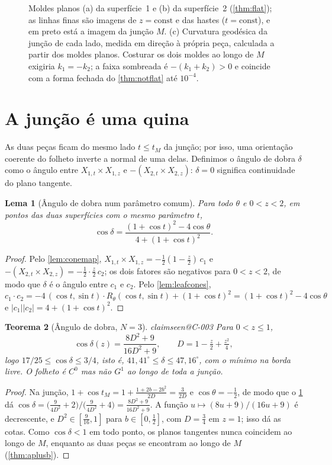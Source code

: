 \documentclass[11pt,a4paper]{article}
\makeatletter
\theoremstyle{plain}
\newtheorem{theorem}{Teorema}[section]
\newtheorem{lemma}[theorem]{Lema}
\theoremstyle{remark}
\newcommand{\claim}[1]{\ifcsname claimseen@#1\endcsname\else\expandafter\gdef\csname claimseen@#1\endcsname{}\label{claim:#1}\fi}
\makeatother
\begin{document}
\begin{figure}[t]\centering

\caption{Moldes planos (a) da superfície~1 e (b) da superfície~2 (\cref{thm:flat}); as linhas finas são imagens de
$z=\mathrm{const}$ e das hastes ($t=\mathrm{const}$), e em preto está a imagem da junção $M$. (c) Curvatura geodésica da junção
de cada lado, medida em direção à própria peça, calculada a partir dos moldes planos. Costurar os dois moldes ao longo de $M$
exigiria $k_1=-k_2$; a faixa sombreada é $-(k_1+k_2)>0$ e coincide com a forma fechada do \cref{thm:notflat} até $10^{-4}$.}
\label{fig:flat}
\end{figure}

\section{A junção é uma quina}\label{sec:crease}

As duas peças ficam do mesmo lado $t\le t_M$ da junção; por isso, uma orientação coerente do folheto inverte a normal de uma
delas. Definimos o ângulo de dobra $\delta$ como o ângulo entre $X_{1,t}\times X_{1,z}$ e $-(X_{2,t}\times X_{2,z})$:
$\delta=0$ significa continuidade do plano tangente.

\begin{lemma}[Ângulo de dobra num parâmetro comum]\label{lem:foldt}
Para todo $\theta$ e $0<z<2$, em pontos das duas superfícies com o mesmo parâmetro $t$,
\[ \cos\delta=\frac{(1+\cos t)^2-4\cos\theta}{4+(1+\cos t)^2}. \]
\end{lemma}
\begin{proof}
Pelo \cref{lem:conemap}, $X_{1,t}\times X_{1,z}=-\frac12(1-\frac z2)\,c_1$ e $-(X_{2,t}\times X_{2,z})=-\frac12\cdot\frac z2\,c_2$;
os dois fatores são negativos para $0<z<2$, de modo que $\delta$ é o ângulo entre $c_1$ e $c_2$. Pelo \cref{lem:leafcones},
$c_1\cdot c_2=-4\,(\cos t,\sin t)\cdot R_\theta(\cos t,\sin t)+(1+\cos t)^2=(1+\cos t)^2-4\cos\theta$ e
$|c_1||c_2|=4+(1+\cos t)^2$.
\end{proof}

\begin{theorem}[Ângulo de dobra, $N=3$]\label{thm:fold3}\claim{C-003}
Para $0<z\le1$,
\[ \cos\delta(z)=\frac{8D^2+9}{16D^2+9},\qquad D=1-\tfrac z2+\tfrac{z^2}4, \]
logo $17/25\le\cos\delta\le3/4$, isto é, $41{,}41^\circ\le\delta\le47{,}16^\circ$, com o mínimo na borda livre. O folheto é
$C^0$ mas não $G^1$ ao longo de toda a junção.
\end{theorem}
\begin{proof}
Na junção, $1+\cos t_M=1+\frac{1+2b-2b^2}{2D}=\frac{3}{2D}$ e $\cos\theta=-\frac12$, de modo que o \cref{lem:foldt} dá
$\cos\delta=\big(\frac{9}{4D^2}+2\big)/\big(\frac{9}{4D^2}+4\big)=\frac{8D^2+9}{16D^2+9}$. A função $u\mapsto(8u+9)/(16u+9)$ é
decrescente, e $D^2\in[\frac9{16},1]$ para $b\in[0,\frac12]$, com $D=\frac34$ em $z=1$; isso dá as cotas. Como $\cos\delta<1$
em todo ponto, os planos tangentes nunca coincidem ao longo de $M$, enquanto as duas peças se encontram ao longo de $M$
(\cref{thm:aplusb}).
\end{proof}
\end{document}

